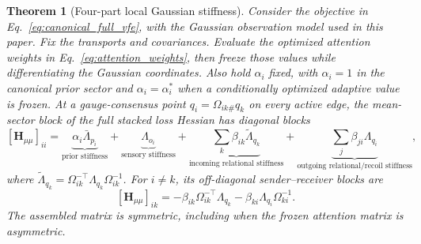 \documentclass[12pt]{article}
\newtheorem{theorem}{Theorem}
\begin{document}
\begin{theorem}[Four-part local Gaussian stiffness]
\label{thm:four_part_stiffness}
Consider the objective in Eq.~\eqref{eq:canonical_full_vfe}, with the Gaussian observation model used in this paper. Fix the transports and covariances. Evaluate the optimized attention weights in Eq.~\eqref{eq:attention_weights}, then freeze those values while differentiating the Gaussian coordinates. Also hold $\alpha_i$ fixed, with $\alpha_i=1$ in the canonical prior sector and $\alpha_i=\alpha_i^*$ when a conditionally optimized adaptive value is frozen. At a gauge-consensus point $q_i=\Omega_{ik\#}q_k$ on every active edge, the mean-sector block of the full stacked loss Hessian has diagonal blocks
\begin{equation}
\boxed{
[\mathbf H_{\mu\mu}]_{ii}
=\underbrace{\alpha_i\bar\Lambda_{p_i}}_{\text{prior stiffness}}
+\underbrace{\Lambda_{o_i}}_{\text{sensory stiffness}}
+\underbrace{\sum_k\beta_{ik}\widetilde\Lambda_{q_k}}_{\text{incoming relational stiffness}}
+\underbrace{\sum_j\beta_{ji}\Lambda_{q_i}}_{\text{outgoing relational/recoil stiffness}},}
\label{eq:stiffness_diagonal}
\end{equation}
where $\widetilde\Lambda_{q_k}=\Omega_{ik}^{-\top}\Lambda_{q_k}\Omega_{ik}^{-1}$. For $i\ne k$, its off-diagonal sender--receiver blocks are
\begin{equation}
\boxed{
[\mathbf H_{\mu\mu}]_{ik}
=-\beta_{ik}\Omega_{ik}^{-\top}\Lambda_{q_k}
-\beta_{ki}\Lambda_{q_i}\Omega_{ki}^{-1}.}
\label{eq:stiffness_offdiagonal}
\end{equation}
The assembled matrix is symmetric, including when the frozen attention matrix is asymmetric.
\end{theorem}
\end{document}
